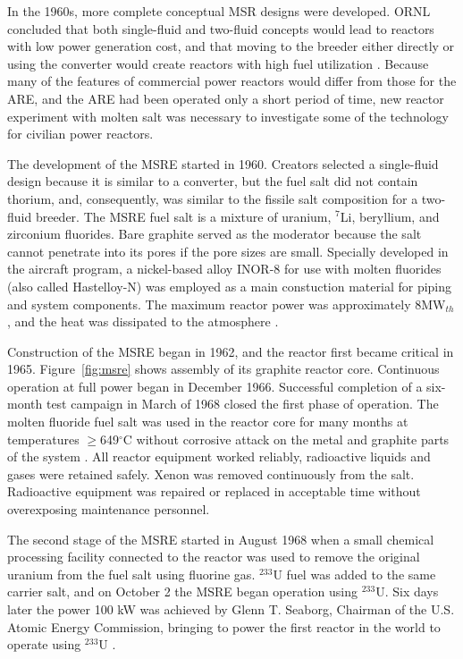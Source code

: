 In the 1960s, more complete conceptual \gls{MSR} designs were developed. \gls{ORNL} concluded that both single-fluid and two-fluid concepts would lead to reactors with low power generation cost, and that moving to the breeder either directly or using the converter would create reactors with high fuel utilization \cite{rosenthal_molten-salt_1970}. Because many of the features of commercial power reactors would differ from those for the \gls{ARE}, and the \gls{ARE} had been operated only a short period of time, new reactor experiment with molten salt was necessary to investigate some of the technology for civilian power reactors.

The development of the \gls{MSRE} started in 1960. Creators selected a single-fluid design because it is similar to a converter, but the fuel salt did not contain thorium, and, consequently, was similar to the fissile salt composition for a two-fluid breeder. The \gls{MSRE} fuel salt is a mixture of uranium, $^7$Li, beryllium, and zirconium fluorides. Bare graphite served as the moderator because the salt cannot penetrate into its pores if the pore sizes are small. Specially developed in the aircraft program, a nickel-based alloy INOR-8 for use with molten fluorides (also called Hastelloy-N) was employed as a main constuction material for piping and system components. The maximum reactor power was approximately 8MW$_{th}$, and the heat was dissipated to the atmosphere \cite{haubenreich_experience_1970}.

Construction of the \gls{MSRE} began in 1962, and the reactor first became critical in 1965. Figure~\ref{fig:msre} shows assembly of its graphite reactor core. Continuous operation at full power began in December 1966. Successful completion of a six-month test campaign in March of 1968 closed the first phase of operation. The molten fluoride fuel salt was used in the reactor core for many months at temperatures $\geq$649$^{\circ}$C without corrosive attack on the metal and graphite parts of the system \cite{rosenthal_molten-salt_1970}. All reactor equipment worked reliably, radioactive liquids and gases were retained safely. Xenon was removed continuously from the salt. Radioactive equipment was repaired or replaced in acceptable time without overexposing maintenance personnel.

The second stage of the \gls{MSRE} started in August 1968 when a small chemical processing facility connected to the reactor was used to remove the original uranium from the fuel salt using fluorine gas. $^{233}$U fuel was added to the same carrier salt, and on October 2 the \gls{MSRE} began operation using $^{233}$U. Six days later the power 100 kW was achieved by Glenn T. Seaborg, Chairman of the U.S. Atomic Energy Commission, bringing to power the first reactor in the world to operate using $^{233}$U \cite{haubenreich_experience_1970}.

